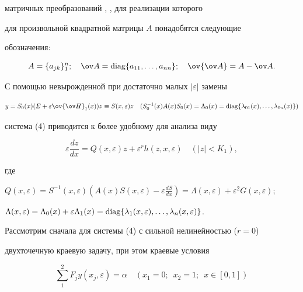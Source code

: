 матричных преобразований \cite{5}, \cite{6}, для реализации которого 


для произвольной квадратной матрицы $A$ понадобятся следующие 


обозначения:


$$ 


A=\{a_{jk}\}^n_1;\quad \ov A=\diag\{a_{11},\dotsc,a_{nn}\};\quad 


\ov{\ov A}=A-\ov A. 


$$ 


С помощью невырожденной при достаточно малых $|\varepsilon|$ замены 


\cite{5} 


\begin{equation} 


y=S_0(x)(E+\varepsilon\ov{\ov H}_1(x))z\equiv  


S(x,\varepsilon)z\quad (S^{-1}_0(x)A(x)S_0(x)= 


\Lambda_0(x)=\diag\{\lambda_{01}(x),\dotsc,\lambda_{0n}(x)\}) 


\end{equation} 


система (4) приводится к более удобному для анализа виду 


\begin{equation} 


\varepsilon\frac{dz}{dx}=Q(x,\varepsilon)z+\varepsilon^r 


h(z,x,\varepsilon)\quad (|z|<K_1), 


\end{equation} 


где 


$Q(x,\varepsilon)=S^{-1}(x,\varepsilon) 


(A(x)S(x,\varepsilon)-\varepsilon\tfrac{dS}{dx})= 


\Lambda(x,\varepsilon)+\varepsilon^2G(x,\varepsilon)$; 


$\Lambda(x,\varepsilon)=\Lambda_0(x)+\varepsilon\Lambda_1(x)= 


\diag\{\lambda_1(x,\varepsilon),\dotsc,\lambda_n(x,\varepsilon)\}$. 


 


Рассмотрим сначала для системы (4) с сильной нелинейностью ($r=0$) 


двухточечную краевую задачу, при этом краевые условия 


\begin{equation} 


\sum^2_1 F_j y(x_j,\varepsilon)=\alpha\quad 


(x_1=0;\ \; x_2=1;\ \; x\in[0,1]) 


\end{equation} 


